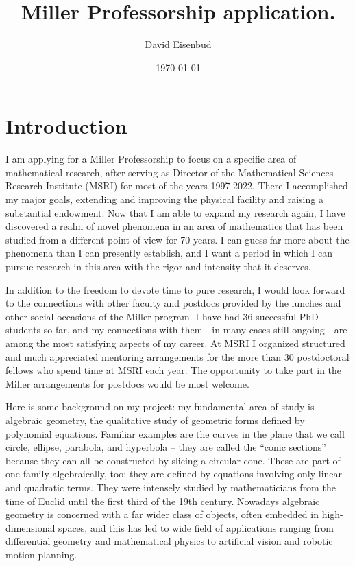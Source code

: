 \documentclass[11pt, oneside]{article}   	%
\title{Miller Professorship application.}
\author{David Eisenbud}
\date{\today}							%
\begin{document}
\maketitle
\section*{Introduction}

I am applying for a Miller Professorship to focus on a specific area of mathematical research, after serving as Director of the Mathematical Sciences Research Institute (MSRI) for most of the years 1997-2022. There I accomplished my major goals, extending and  improving the physical facility and raising a substantial endowment. Now that I am able to expand my research again, I have discovered a realm of novel phenomena in an area of mathematics that has been studied from a different point of view for 70 years. I can guess far more about the phenomena than I can presently establish, and I want a period in which I can pursue research in this area with the rigor and intensity that it deserves. 

In addition to the freedom to devote time to pure research, I would look forward to the connections with other faculty and postdocs provided by the lunches and other social occasions of the  Miller program. I have had 36 successful PhD students so far, and my connections with them---in many cases still ongoing---are among the most satisfying aspects of my career. At MSRI I organized structured and much appreciated mentoring arrangements for the more than 30 postdoctoral fellows who spend time at MSRI each year. The opportunity to take part in the Miller arrangements for postdocs would be most welcome.

Here is some background on my project: my fundamental area of study is algebraic geometry, the qualitative study of geometric forms defined by polynomial equations. Familiar examples are the curves in the plane that we call circle, ellipse, parabola, and hyperbola – they are called the “conic sections” because they can
all be constructed by slicing a circular cone. These are part of one family algebraically, too: they are defined by equations involving only linear and quadratic terms. They were intensely studied by mathematicians from the time of Euclid until the first third of the 19th century. Nowadays algebraic geometry is concerned with a far wider class of objects, often embedded in high-dimensional spaces, and this has led to wide field of applications ranging from differential geometry and mathematical physics to artificial vision and robotic motion planning. 
\end{document}
